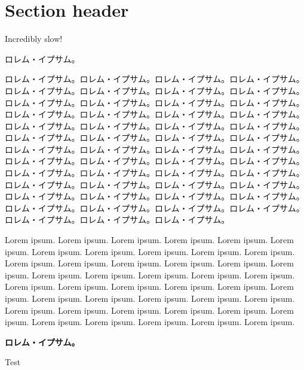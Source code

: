 \documentclass{ltjarticle}
\begin{document}
\section{Section header}

Incredibly slow!

ロレム・イプサム。

ロレム・イプサム。ロレム・イプサム。ロレム・イプサム。ロレム・イプサム。ロレム・イプサム。ロレム・イプサム。ロレム・イプサム。ロレム・イプサム。ロレム・イプサム。ロレム・イプサム。ロレム・イプサム。ロレム・イプサム。ロレム・イプサム。ロレム・イプサム。ロレム・イプサム。ロレム・イプサム。ロレム・イプサム。ロレム・イプサム。ロレム・イプサム。ロレム・イプサム。ロレム・イプサム。ロレム・イプサム。ロレム・イプサム。ロレム・イプサム。ロレム・イプサム。ロレム・イプサム。ロレム・イプサム。ロレム・イプサム。ロレム・イプサム。ロレム・イプサム。ロレム・イプサム。ロレム・イプサム。ロレム・イプサム。ロレム・イプサム。ロレム・イプサム。ロレム・イプサム。ロレム・イプサム。ロレム・イプサム。ロレム・イプサム。ロレム・イプサム。ロレム・イプサム。ロレム・イプサム。ロレム・イプサム。ロレム・イプサム。ロレム・イプサム。ロレム・イプサム。ロレム・イプサム。ロレム・イプサム。ロレム・イプサム。ロレム・イプサム。ロレム・イプサム。

Lorem ipsum. Lorem ipsum. Lorem ipsum. Lorem ipsum. Lorem ipsum. Lorem ipsum. Lorem ipsum. Lorem ipsum. Lorem ipsum. Lorem ipsum. Lorem ipsum. Lorem ipsum. Lorem ipsum. Lorem ipsum. Lorem ipsum. Lorem ipsum. Lorem ipsum. Lorem ipsum. Lorem ipsum. Lorem ipsum. Lorem ipsum. Lorem ipsum. Lorem ipsum. Lorem ipsum. Lorem ipsum. Lorem ipsum. Lorem ipsum. Lorem ipsum. Lorem ipsum. Lorem ipsum. Lorem ipsum. Lorem ipsum. Lorem ipsum. Lorem ipsum. Lorem ipsum. Lorem ipsum. Lorem ipsum. Lorem ipsum. Lorem ipsum. Lorem ipsum. Lorem ipsum. Lorem ipsum. Lorem ipsum. Lorem ipsum.

\textbf{ロレム・イプサム。}

Test
\end{document}
